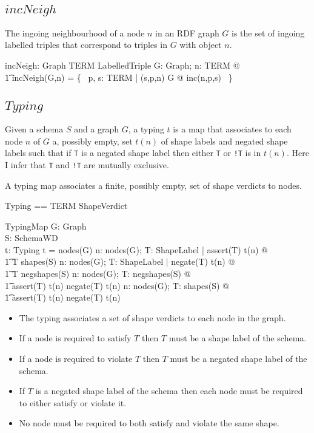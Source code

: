 \documentclass{article}
\begin{document}
\subsection{$incNeigh$}
The ingoing neighbourhood of a node $n$ in an RDF graph $G$ is the set of ingoing labelled triples that correspond to triples
in $G$ with object $n$.
\begin{axdef}
	incNeigh: Graph \cross TERM \fun \finset LabelledTriple
\where
	\forall G: Graph; n: TERM @ \\
\t1		incNeigh(G,n) = \{~ p, s: TERM | (s,p,n) \in G @ inc(n,p,s) ~\}
\end{axdef}

\subsection{$Typing$}
Given a schema $S$ and a graph $G$, a typing $t$ is a map that associates to each node $n$ of $G$ a, possibly empty, set $t(n)$ of shape labels and negated shape labels such that if {\tt T} is a negated shape label then either {\tt T} or {\tt !T} is in $t(n)$.
Here I infer that {\tt T} and {\tt !T} are mutually exclusive.

A typing map associates a finite, possibly empty, set of shape verdicts to nodes.
\begin{zed}
	Typing == TERM \pfun \finset ShapeVerdict
\end{zed}

\begin{schema}{TypingMap}
	G: Graph \\
	S: SchemaWD \\
	t: Typing
\where
	\dom t = nodes(G)
\also
	\forall n: nodes(G); T: ShapeLabel | assert(T) \in t(n) @ \\
\t1		T \in shapes(S)
\also
	\forall n: nodes(G); T: ShapeLabel | negate(T) \in t(n) @ \\
\t1		T \in negshapes(S)
\also
	\forall n: nodes(G); T: negshapes(S) @ \\
\t1		assert(T) \in t(n) \lor negate(T) \in t(n)
\also
	\forall n: nodes(G); T: shapes(S) @ \\
\t1		assert(T) \notin t(n) \lor negate(T) \notin t(n)
\end{schema}
\begin{itemize}
\item The typing associates a set of shape verdicts to each node in the graph.
\item If a node is required to satisfy $T$ then $T$ must be a shape label of the schema.
\item If a node is required to violate $T$ then $T$ must be a negated shape label of the schema.
\item If $T$ is a negated shape label of the schema then each node must be required to either satisfy or violate it.
\item No node must be required to both satisfy and violate the same shape.
\end{itemize}
\end{document}
